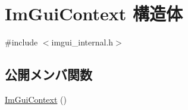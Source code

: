 \hypertarget{struct_im_gui_context}{}\section{Im\+Gui\+Context 構造体}
\label{struct_im_gui_context}


{\ttfamily \#include $<$imgui\+\_\+internal.\+h$>$}

\subsection*{公開メンバ関数}
\begin{DoxyCompactItemize}
\item 
\mbox{\hyperlink{struct_im_gui_context_a28776600467e31fcc353a8aedec727f1}{Im\+Gui\+Context}} ()
\end{DoxyCompactItemize}
